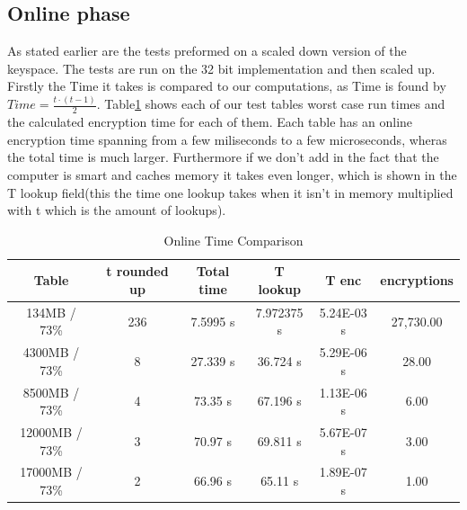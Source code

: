 \subsection{Online phase}
As stated earlier are the tests preformed on a scaled down version of the keyspace.
The tests are run on the 32 bit implementation and then scaled up.
Firstly the Time it takes is compared to our computations, as Time is found by $Time=\frac{t\cdot(t-1)}{2}$.
Table\ref{tab:OnlineT} shows each of our test tables worst case run times and the calculated encryption time for each of them.
Each  table has an online encryption time spanning from a few miliseconds to a few microseconds, wheras the total time is  much larger.
Furthermore if we don't add in the fact that the computer is smart and caches memory it takes even longer, which is shown in the T lookup field(this the time one lookup takes when it isn't in memory multiplied with t which is the amount of lookups).
\begin{table}[H]
\centering
\caption{Online Time Comparison}
\label{tab:OnlineT}
\begin{tabular}{|c|ccccc}
\hline
Table          & \multicolumn{1}{c|}{t rounded up} & \multicolumn{1}{c|}{Total time} & \multicolumn{1}{c|}{T lookup} & \multicolumn{1}{c|}{T enc} & \multicolumn{1}{c|}{encryptions} \\ \hline
134MB / 73\%   & 236                           & 7.5995 s                        & 7.972375 s                    & 5.24E-03 s                 & 27,730.00                        \\ \cline{1-1}
4300MB / 73\%  & 8                             & 27.339 s                        & 36.724 s                      & 5.29E-06 s                 & 28.00                            \\ \cline{1-1}
8500MB / 73\%  & 4                             & 73.35 s                         & 67.196 s                      & 1.13E-06 s                 & 6.00                             \\ \cline{1-1}
12000MB / 73\% & 3                             & 70.97 s                         & 69.811 s                      & 5.67E-07 s                 & 3.00                             \\ \cline{1-1}
17000MB / 73\%  & 2                             & 66.96 s                         & 65.11 s                       & 1.89E-07 s                 & 1.00                             \\ \cline{1-1}
\end{tabular}
\end{table}

